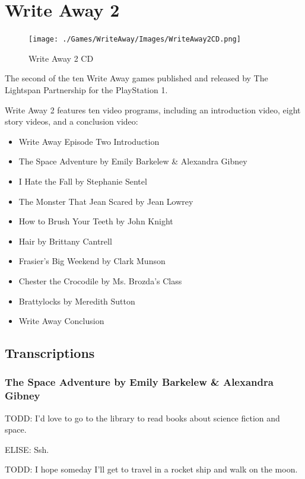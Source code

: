 \chapter{Write Away 2}

\begin{figure}[H]
    \centering
    \texttt{[image: ./Games/WriteAway/Images/WriteAway2CD.png]}
    \caption{Write Away 2 CD}
\end{figure}

The second of the ten Write Away games published and released by The Lightspan Partnership for the PlayStation 1.

Write Away 2 features ten video programs, including an introduction video, eight story videos, and a conclusion video:

\begin{itemize}
    \item Write Away Episode Two Introduction
    \item The Space Adventure by Emily Barkelew \& Alexandra Gibney
    \item I Hate the Fall by Stephanie Sentel
    \item The Monster That Jean Scared by Jean Lowrey
    \item How to Brush Your Teeth by John Knight
    \item Hair by Brittany Cantrell
    \item Frasier's Big Weekend by Clark Munson
    \item Chester the Crocodile by Ms. Brozda's Class
    \item Brattylocks by Meredith Sutton
    \item Write Away Conclusion
\end{itemize}

\clearpage
\newpage

\section{Transcriptions}

\subsection{The Space Adventure by Emily Barkelew \& Alexandra Gibney}

TODD:
I'd love to go to the library to read books about science fiction and space.

ELISE:
Ssh.

TODD:
I hope someday I'll get to travel in a rocket ship and walk on the moon.

